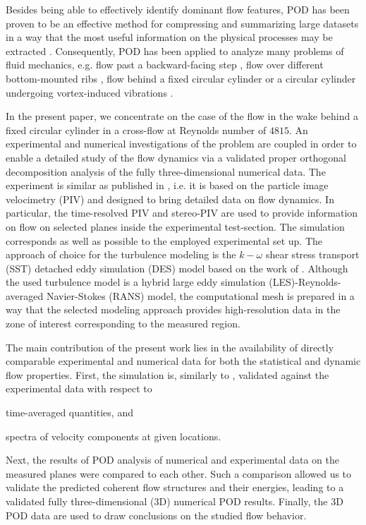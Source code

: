 Besides being able to effectively identify dominant flow features, POD has been proven to be an effective method for compressing and summarizing large datasets in a way that the most useful information on the physical processes may be extracted \citep{kostas2005,feng2010}. Consequently, POD has been applied to analyze many problems of fluid mechanics, e.g. flow past a backward-facing step \citep{kostas2005,kostas2002}, flow over different bottom-mounted ribs \citep{fraga2021}, flow behind a fixed circular cylinder \citep{venturi2006,ma2000,ma2003,feng2010} or a circular cylinder undergoing vortex-induced vibrations \citep{riches2018}.

In the present paper, we concentrate on the case of the flow in the wake behind a {fixed} circular cylinder in a cross-flow at Reynolds number of $4815$. An experimental and numerical investigations of the problem are coupled in order to enable a detailed study of the flow dynamics via a validated proper orthogonal decomposition analysis of the fully three-dimensional numerical data. The experiment is similar as published in \citep{uruba2020,uruba2020a}, i.e. it is based on the particle image velocimetry (PIV) and designed to bring detailed data on flow dynamics. In particular, the time-resolved PIV and stereo-PIV are used to provide information on flow on selected planes inside the experimental test-section. The simulation corresponds as well as possible to the employed experimental set up. The approach of choice for the turbulence modeling is the $k-\omega$ shear stress transport (SST) detached eddy simulation (DES) model based on the work {of} \citet{strelets2001}. Although the used turbulence model is a hybrid large eddy simulation (LES)-Reynolds-averaged Navier-Stokes (RANS) model, the computational mesh is prepared in a way that the selected modeling approach provides high-resolution data in the zone of interest corresponding to the measured region.

The main contribution of the present work lies in {the} availability of directly comparable experimental and numerical data for both the statistical and dynamic flow properties. First, the simulation is, similarly to \citep{jie2016,gonzalez2019}, validated against the experimental data with respect to
\begin{inparaenum}[(i)]
        \item time-averaged quantities, and
        \item spectra of velocity components at given locations.
\end{inparaenum}
Next, the results of POD analysis of numerical and experimental data on the measured planes were compared to each other. Such a comparison allowed us to validate the predicted coherent flow structures and their energies, leading to {a} validated fully three-dimensional (3D) numerical POD results. Finally, the 3D POD data are used to draw conclusions on the studied flow behavior.

